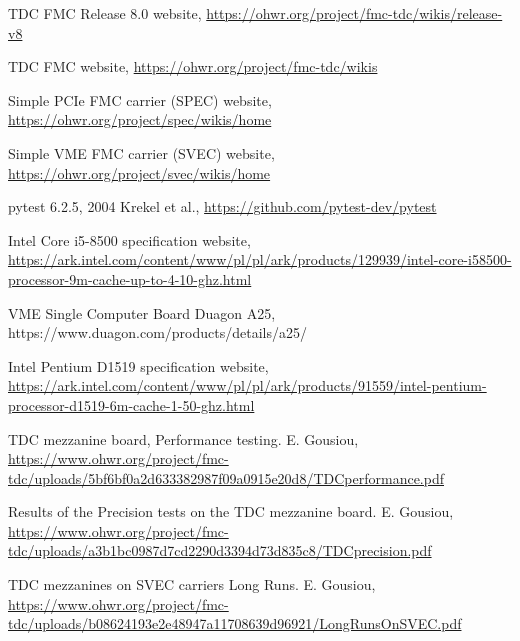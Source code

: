 \documentclass[a4paper, 12pt]{article}
\begin{document}
\begin{thebibliography}{99}
TDC FMC Release 8.0 website,  \url{https://ohwr.org/project/fmc-tdc/wikis/release-v8}

TDC FMC website,  \url{https://ohwr.org/project/fmc-tdc/wikis}

Simple PCIe FMC carrier (SPEC) website,  \url{https://ohwr.org/project/spec/wikis/home}

Simple VME FMC carrier (SVEC) website,  \url{https://ohwr.org/project/svec/wikis/home}

pytest 6.2.5, 2004
Krekel et al., \url{https://github.com/pytest-dev/pytest}

Intel Core i5-8500 specification website,\\
\url{https://ark.intel.com/content/www/pl/pl/ark/products/129939/intel-core-i58500-processor-9m-cache-up-to-4-10-ghz.html}

VME Single Computer Board Duagon A25, https://www.duagon.com/products/details/a25/

Intel Pentium D1519 specification website,\\
\url{https://ark.intel.com/content/www/pl/pl/ark/products/91559/intel-pentium-processor-d1519-6m-cache-1-50-ghz.html}

TDC mezzanine board, Performance testing. E. Gousiou,
\url{https://www.ohwr.org/project/fmc-tdc/uploads/5bf6bf0a2d633382987f09a0915e20d8/TDCperformance.pdf}

Results of the Precision tests on the TDC mezzanine board. E. Gousiou,\\
\url{https://www.ohwr.org/project/fmc-tdc/uploads/a3b1bc0987d7cd2290d3394d73d835c8/TDCprecision.pdf}

TDC mezzanines on SVEC carriers Long Runs. E. Gousiou,
\url{https://www.ohwr.org/project/fmc-tdc/uploads/b08624193e2e48947a11708639d96921/LongRunsOnSVEC.pdf}
\end{thebibliography}
\end{document}

